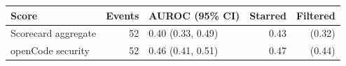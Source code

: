 \begin{tabular}{lrlrr}
\toprule
Score & Events & AUROC (95\% CI) & Starred & Filtered \\
\midrule
Scorecard aggregate & 52 & 0.40 (0.33, 0.49) & 0.43 & (0.32) \\
openCode security & 52 & 0.46 (0.41, 0.51) & 0.47 & (0.44) \\
\bottomrule
\end{tabular}
